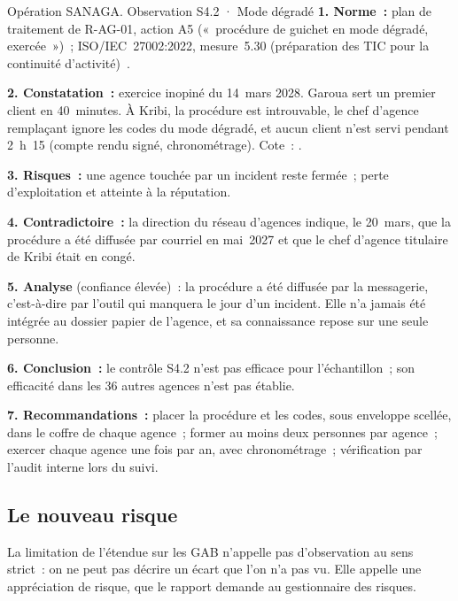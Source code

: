 \begin{boxscenario}{Opération SANAGA. Observation S4.2 · Mode dégradé}
\textbf{1. Norme~:} plan de traitement de R-AG-01, action A5 («~procédure
de guichet en mode dégradé, exercée~»)~; ISO/IEC~27002:2022, mesure~5.30
(préparation des TIC pour la continuité d'activité)~\cite{iso27002_2022}.

\medskip
\textbf{2. Constatation~:} exercice inopiné du 14~mars 2028. Garoua sert
un premier client en 40~minutes. À Kribi, la procédure est introuvable, le
chef d'agence remplaçant ignore les codes du mode dégradé, et aucun client
n'est servi pendant 2~h~15 (compte rendu signé, chronométrage). Cote~:
\NON{}.

\medskip
\textbf{3. Risques~:} une agence touchée par un incident reste fermée~;
perte d'exploitation et atteinte à la réputation.

\medskip
\textbf{4. Contradictoire~:} la direction du réseau d'agences indique, le
20~mars, que la procédure a été diffusée par courriel en mai~2027 et que le
chef d'agence titulaire de Kribi était en congé.

\medskip
\textbf{5. Analyse} (confiance élevée)~: la procédure a été diffusée par
la messagerie, c'est-à-dire par l'outil qui manquera le jour d'un incident.
Elle n'a jamais été intégrée au dossier papier de l'agence, et sa
connaissance repose sur une seule personne.

\medskip
\textbf{6. Conclusion~:} le contrôle S4.2 n'est pas efficace pour
l'échantillon~; son efficacité dans les 36 autres agences n'est pas
établie.

\medskip
\textbf{7. Recommandations~:} placer la procédure et les codes, sous
enveloppe scellée, dans le coffre de chaque agence~; former au moins deux
personnes par agence~; exercer chaque agence une fois par an, avec
chronométrage~; vérification par l'audit interne lors du suivi.
\end{boxscenario}

\subsection{Le nouveau risque}

La limitation de l'étendue sur les GAB n'appelle pas d'observation au sens
strict~: on ne peut pas décrire un écart que l'on n'a pas vu. Elle appelle
une appréciation de risque, que le rapport demande au gestionnaire des
risques.

